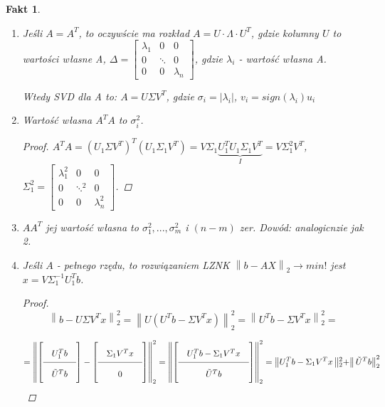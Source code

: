 \documentclass[hidelinks,a4paper,fleqn,oneside]{book}
\newcommand{\ra}{\rightarrow}
\newcommand{\norm}[1]{\left\lVert#1\right\rVert}
\newtheorem{fakt}{Fakt}
\begin{document}
\begin{fakt} $\ $ %
	\begin{enumerate}
		\item Jeśli $A=A^T$, to oczywście ma rozkład $A = U \cdot \Lambda \cdot U^T$, gdzie kolumny $U$ to wartości własne A, $\Delta = \begin{bmatrix}
		      \lambda_1 & 0 & 0\\ 
		      0 & \ddots & 0\\ 
		      0 & 0 & \lambda_n 
		\end{bmatrix}$, gdzie $\lambda_i$ - wartość własna A.
		
		Wtedy SVD dla A to:
		$A = U\Sigma V^T$, gdzie $\sigma_i = |\lambda_i|$, $v_i = sign(\lambda_i)u_i$
		 			
		\item Wartość własna $A^TA$ to $\sigma_i^2$.
		       			
	      \begin{proof}
	       	$A^TA = (U_1\Sigma V^T)^T(U_1 \Sigma_1 V^T) = V \Sigma_1 \underbrace{U_1^T U_1 \Sigma_1 V^T}_{I} = V \Sigma_1^2V^T$, $\Sigma_1^2 = \begin{bmatrix}
		      \lambda_1^2 & 0 & 0\\ 
		      0 & \ddots^2 & 0\\ 
		      0 & 0 & \lambda_n^2 
			\end{bmatrix}$.
		\end{proof}
				
		\item $AA^T$ jej wartość własna to $\sigma_1^2, ..., \sigma_m^2$ i $(n-m)$ zer.
		      Dowód: analogicnzie jak 2.
		      		
		\item Jeśli $A$ - pełnego rzędu, to rozwiązaniem LZNK $\norm{b - AX}_2 \ra min!$ jest $x = V\Sigma_1^{-1} U_1^Tb$.
		      		
		      \begin{proof}
		      \[
		      	\norm{b - U\Sigma V^Tx} _2 ^2 = \norm{U(U^Tb - \Sigma V^Tx)}_2^2 = \norm{U^Tb - \Sigma V^Tx}_2^2 =
		      	\]
		      	
		      	\[\arraycolsep=1em\def\arraystretch{2} = \norm{\left[\begin{array}{c}
		      	U_1^Tb\\ 
		      	\hline
		      	\tilde{U}^Tb
		      	\end{array}\right] - \left[\begin{array}{c}\Sigma_1V^Tx\\ \hline 0 \end{array}\right]}_2^2 = \norm{\left[\begin{array}{c}U_1^Tb - \Sigma_1V^Tx\\ \hline \tilde{U}^Tb \end{array}\right]}_2^2 =\norm{U_1^Tb - \Sigma_1V^Tx\norm{_2^2 +} \tilde{U}^Tb}_2^2
		      \]
		      

\end{proof}
\end{enumerate}
\end{fakt}
\end{document}
